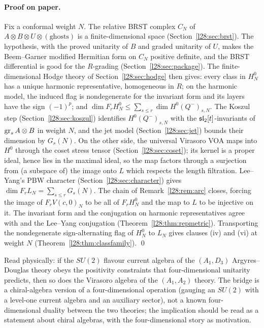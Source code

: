 \paragraph{Proof on paper.} Fix a conformal weight $N$. The relative BRST complex $C_N$ of $A\otimes B\otimes U\otimes(\text{ghosts})$
is a finite-dimensional space (Section~\ref{l28:sec:brst}). The hypothesis, with the proved unitarity of $B$ and graded unitarity of
$U$, makes the Beem--Garner modified Hermitian form on $C_N$ positive definite, and the BRST differential is good for the
$R$-grading (Section~\ref{l28:sec:package}). The finite-dimensional Hodge theory of Section~\ref{l28:sec:hodge} then gives: every
class in $H^0_N$ has a unique harmonic representative, homogeneous in $R$; on the harmonic model, the induced flag is nondegenerate
for the invariant form and its layers have the sign $(-1)^p$; and $\dim F_rH^0_N\le\sum_{s\le r}\dim H^0(Q^-)_{s,N}$. The Koszul step
(Section~\ref{l28:sec:koszul}) identifies $H^0(Q^-)_{s,N}$ with the $\mathfrak{sl}_2[t]$-invariants of $\operatorname{gr}_sA\otimes B$
in weight $N$, and the jet model (Section~\ref{l28:sec:jet}) bounds their dimension by $G_s(N)$. On the other side, the universal
Virasoro VOA maps into $H^0$ through the coset stress tensor (Section~\ref{l28:sec:coset}); its kernel is a proper ideal, hence lies
in the maximal ideal, so the map factors through a surjection from (a subspace of) the image onto $L$ which respects the length
filtration. Lee--Yang's PBW character (Section~\ref{l28:sec:character}) gives $\dim F_rL_N=\sum_{s\le r}G_s(N)$. The chain of
Remark~\ref{l28:rem:arc} closes, forcing the image of $F_rV(c,0)_N$ to be all of $F_rH^0_N$ and the map to $L$ to be injective
on it. The invariant form and the conjugation on harmonic representatives agree with  and the Lee--Yang conjugation
(Theorem~\ref{l28:thm:repmetric}). Transporting the nondegenerate sign-alternating flag of $H^0_N$ to $L_N$ gives clauses (iv)
and (vi) at weight $N$ (Theorem~\ref{l28:thm:classfamily}). \qed

\begin{physics}
Read physically: if the $SU(2)$ flavour current algebra of the $(A_1,D_3)$ Argyres--Douglas theory obeys the positivity constraints
that four-dimensional unitarity predicts, then so does the Virasoro algebra of the $(A_1,A_2)$ theory. The bridge is a
chiral-algebra version of a four-dimensional operation (gauging an $SU(2)$ with a level-one current algebra and an auxiliary sector),
not a known four-dimensional duality between the two theories; the implication should be read as a statement about chiral algebras,
with the four-dimensional story as motivation.
\end{physics}

